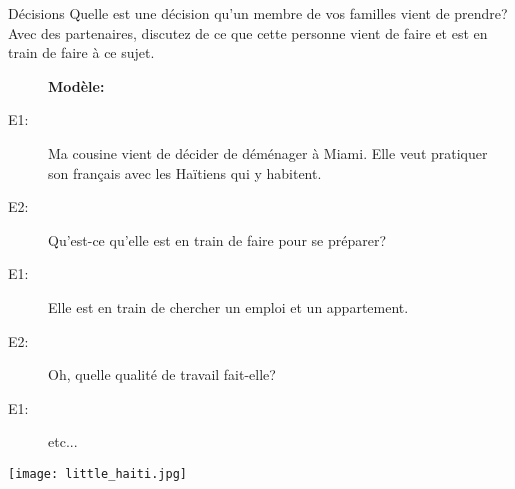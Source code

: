 \begin{frame}{Décisions}
  Quelle est une décision qu'un membre de vos familles \alert{vient de} prendre?
  Avec des partenaires, discutez de ce que cette personne vient de faire et \alert{est en train de} faire à ce sujet.
  \begin{description}
    \item[] \textbf{Modèle:}
    \item[E1:] Ma cousine \alert{vient de} décider de déménager à Miami. Elle veut pratiquer son français avec les Haïtiens qui y habitent.
    \item[E2:] Qu'est-ce qu'elle \alert{est en train de} faire pour se préparer?
    \item[E1:] Elle \alert{est en train de} chercher un emploi et un appartement.
    \item[E2:] Oh, quelle qualité de travail fait-elle?
    \item[E1:] etc...
  \end{description}
  \begin{center}
    \texttt{[image: little\_haiti.jpg]}
  \end{center}
\end{frame}